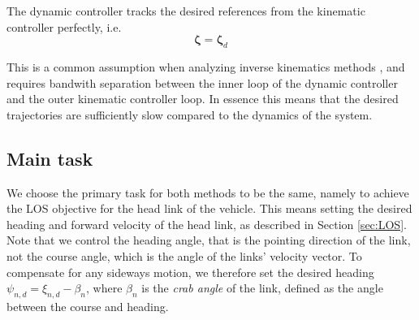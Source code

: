 \documentclass[../main.tex]{subfiles}
\begin{document}
\begin{assumption}
    \label{ass:perfect_dyn}
    The dynamic controller tracks the desired references from the kinematic controller perfectly, i.e.
    \begin{equation}
        \bm{\zeta} = \bm{\zeta}_d
    \end{equation}
\end{assumption}

\begin{remark}
    This is a common assumption when analyzing inverse kinematics methods \citep{antonelli2009}, and requires bandwith separation between the inner loop of the dynamic controller and the outer kinematic controller loop. In essence this means that the desired trajectories are sufficiently slow compared to the dynamics of the system.
\end{remark}

\subsection{Main task}
\label{sec:main_task}
We choose the primary task for both methods to be the same, namely to achieve the LOS objective for the head link of the vehicle. This means setting the desired heading and forward velocity of the head link, as described in Section \ref{sec:LOS}. Note that we control the heading angle, that is the pointing direction of the link, not the course angle, which is the angle of the links' velocity vector. To compensate for any sideways motion, we therefore set the desired heading $\psi_{n,d} = \xi_{n,d} - \beta_n$, where $\beta_n$ is the \emph{crab angle} \citep{fossen2021} of the link, defined as the angle between the course and heading.
\end{document}
